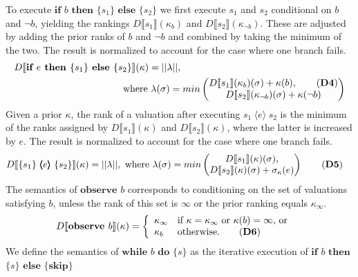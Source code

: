 \documentclass{llncs}
\newcommand{\dn}[1]{D\llbracket #1 \rrbracket}
\newcommand{\Rank}[1]{\hspace{3pt} \pmb{\langle} #1 \pmb{\rangle}\hspace{3pt} } %
\begin{document}
To execute $\textbf{if }b\textbf{ then }\{ s_1 \}\textbf{ else }\{ s_2 \}$ we first 
	execute $s_1$ and $s_2$ conditional on $b$ and $\neg b$,
		yielding the rankings $\dn{s_1}(\kappa_{b})$ and $\dn{s_2}(\kappa_{\neg b})$.
	These are adjusted by adding the prior ranks of $b$ and $\neg b$ and
		combined by taking the minimum of the two.
	The result is normalized to account for the case where one branch fails.
\begin{align*}
\dn{\textbf{if }e\textbf{ then }\{ s_1 \}\textbf{ else }\{ s_2 \}}(\kappa)	& = || \lambda ||,   \\ 
			&  \hspace{-30pt} \mbox{ where }\lambda(\sigma) = min\begin{pmatrix} \dn{s_1}(\kappa_{b})(\sigma) + \kappa(b), \tag{\textbf{D4}} \\ \dn{s_2}(\kappa_{\neg b})(\sigma) + \kappa(\neg b) \end{pmatrix}  
\end{align*}
	Given a prior $\kappa$, the rank of a valuation after executing $s_1 \Rank{e} s_2$
		is the minimum of the ranks assigned by $\dn{s_1}(\kappa)$ and $\dn{s_2}(\kappa)$,
			where the latter is increased by $e$.
	The result is normalized to account for the case where one branch fails.
\begin{align}
\dn{\{ s_1 \} \Rank{e} \{ s_2 \}}(\kappa)	& = || \lambda ||, \mbox{ where }\lambda(\sigma) = min \begin{pmatrix} \dn{s_1}(\kappa)(\sigma), \\ \dn{s_2}(\kappa)(\sigma) + \sigma_{\kappa}(e) \end{pmatrix} \tag{\textbf{D5}} 
\end{align}
	The semantics of $\textbf{observe }b$ corresponds to conditioning on the set of valuations satisfying $b$, 
		unless the rank of this set is $\infty$ or the prior ranking equals $\kappa_{\infty}$.
\begin{align}
\dn{\textbf{observe }b}(\kappa)  & = 
		\left\{
			\begin{array}{ll}
				\kappa_{\infty}								& \mbox{if }\kappa = \kappa_\infty\mbox{ or }\kappa(b) = \infty\mbox{, or}\\
				\kappa_{b}								& \mbox{otherwise.}\tag{\textbf{D6}}
			\end{array}
		\right. 
\end{align}
	We define the semantics of $\textbf{while }b\textbf{ do }\{s\}$
		as the iterative execution of $\textbf{if }b$ $\textbf{then}$ $\{s\}$ $\textbf{else } \{\textbf{skip}\}$
\end{document}
